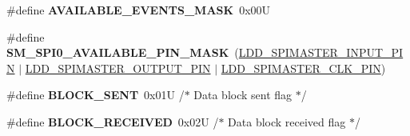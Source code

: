 \begin{DoxyCompactItemize}
\item 
\hypertarget{group___s_m___s_p_i0__module_ga5f04a8830cd52a3ffa1678d113f31aee}{\#define {\bfseries A\-V\-A\-I\-L\-A\-B\-L\-E\-\_\-\-E\-V\-E\-N\-T\-S\-\_\-\-M\-A\-S\-K}~0x00\-U}\label{group___s_m___s_p_i0__module_ga5f04a8830cd52a3ffa1678d113f31aee}

\item 
\hypertarget{group___s_m___s_p_i0__module_ga76e9dd63a67ec1e1c655d668f6645ae8}{\#define {\bfseries S\-M\-\_\-\-S\-P\-I0\-\_\-\-A\-V\-A\-I\-L\-A\-B\-L\-E\-\_\-\-P\-I\-N\-\_\-\-M\-A\-S\-K}~(\hyperlink{group___p_e___types__module_gaf3b26357f173ce919277e89a836121ca}{L\-D\-D\-\_\-\-S\-P\-I\-M\-A\-S\-T\-E\-R\-\_\-\-I\-N\-P\-U\-T\-\_\-\-P\-I\-N} $|$ \hyperlink{group___p_e___types__module_ga31823c100ddaf6729e0a16f7cea77e7a}{L\-D\-D\-\_\-\-S\-P\-I\-M\-A\-S\-T\-E\-R\-\_\-\-O\-U\-T\-P\-U\-T\-\_\-\-P\-I\-N} $|$ \hyperlink{group___p_e___types__module_gad1273260faec4033c18eb56120e8fc7e}{L\-D\-D\-\_\-\-S\-P\-I\-M\-A\-S\-T\-E\-R\-\_\-\-C\-L\-K\-\_\-\-P\-I\-N})}\label{group___s_m___s_p_i0__module_ga76e9dd63a67ec1e1c655d668f6645ae8}

\item 
\hypertarget{group___s_m___s_p_i0__module_ga322d9565732ca3a57eca0e21ae583135}{\#define {\bfseries B\-L\-O\-C\-K\-\_\-\-S\-E\-N\-T}~0x01\-U          /$\ast$ Data block sent flag $\ast$/}\label{group___s_m___s_p_i0__module_ga322d9565732ca3a57eca0e21ae583135}

\item 
\hypertarget{group___s_m___s_p_i0__module_gae2971eaac9ffd8336b5a9b3703419d31}{\#define {\bfseries B\-L\-O\-C\-K\-\_\-\-R\-E\-C\-E\-I\-V\-E\-D}~0x02\-U          /$\ast$ Data block received flag $\ast$/}\label{group___s_m___s_p_i0__module_gae2971eaac9ffd8336b5a9b3703419d31}


\end{DoxyCompactItemize}
